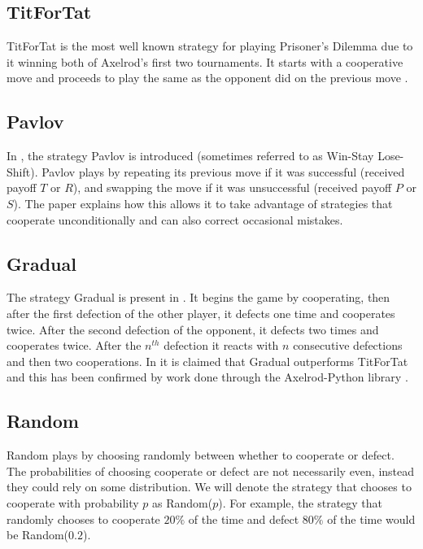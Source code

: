\subsection{TitForTat}\label{ssec:stra_titfortat}
TitForTat is the most well known strategy for playing Prisoner's Dilemma due to it winning both of Axelrod's first two tournaments.
It starts with a cooperative move and proceeds to play the same as the opponent did on the previous move \cite{Axelrod1980b, Heap2003}.

\subsection{Pavlov}\label{ssec:strat_pavlov}
In \cite{Nowak1993}, the strategy Pavlov is introduced (sometimes referred to as Win-Stay Lose-Shift).
Pavlov plays by repeating its previous move if it was successful (received payoff $T$ or $R$), and swapping the move if it was unsuccessful (received payoff $P$ or $S$).
The paper explains how this allows it to take advantage of strategies that cooperate unconditionally and can also correct occasional mistakes.

\subsection{Gradual}\label{ssec:strat_gradual}
The strategy Gradual is present in \cite{Beaufils1997}.
It begins the game by cooperating, then after the first defection of the other player, it defects one time and cooperates twice.
After the second defection of the opponent, it defects two times and cooperates twice.
After the $n^{th}$ defection it reacts with $n$ consecutive defections and then two cooperations.
In \cite{Beaufils1997} it is claimed that Gradual outperforms TitForTat and this has been confirmed by work done through the Axelrod-Python library \cite{Knight2016}.

\subsection{Random}\label{ssec:strat_random}
Random plays  by choosing randomly between whether to cooperate or defect.
The probabilities of choosing cooperate or defect are not necessarily even, instead they could rely on some distribution.
We will denote the strategy that chooses to cooperate with probability $p$ as Random($p$).
For example, the strategy that randomly chooses to cooperate $20\%$ of the time and defect $80\%$ of the time would be Random($0.2$).

